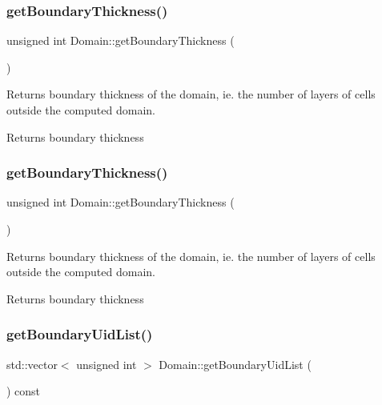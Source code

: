 \subsubsection{\texorpdfstring{get\+Boundary\+Thickness()}{getBoundaryThickness()}\hspace{0.1cm}{\footnotesize\ttfamily [1/2]}}
{\footnotesize\ttfamily unsigned int Domain\+::get\+Boundary\+Thickness (\begin{DoxyParamCaption}{ }\end{DoxyParamCaption})}



Returns boundary thickness of the domain, ie. the number of layers of cells outside the computed domain. 

\begin{DoxyReturn}{Returns}
boundary thickness 
\end{DoxyReturn}
\mbox{\label{classDomain_aa0d225e23c6a454058a3df5b7b5973fa}} 
\subsubsection{\texorpdfstring{get\+Boundary\+Thickness()}{getBoundaryThickness()}\hspace{0.1cm}{\footnotesize\ttfamily [2/2]}}
{\footnotesize\ttfamily unsigned int Domain\+::get\+Boundary\+Thickness (\begin{DoxyParamCaption}{ }\end{DoxyParamCaption})}



Returns boundary thickness of the domain, ie. the number of layers of cells outside the computed domain. 

\begin{DoxyReturn}{Returns}
boundary thickness 
\end{DoxyReturn}
\mbox{\label{classDomain_af3b780bfe072c70ac437f0f31f10d5c4}} 
\subsubsection{\texorpdfstring{get\+Boundary\+Uid\+List()}{getBoundaryUidList()}}
{\footnotesize\ttfamily std\+::vector$<$ unsigned int $>$ Domain\+::get\+Boundary\+Uid\+List (\begin{DoxyParamCaption}{ }\end{DoxyParamCaption}) const}



